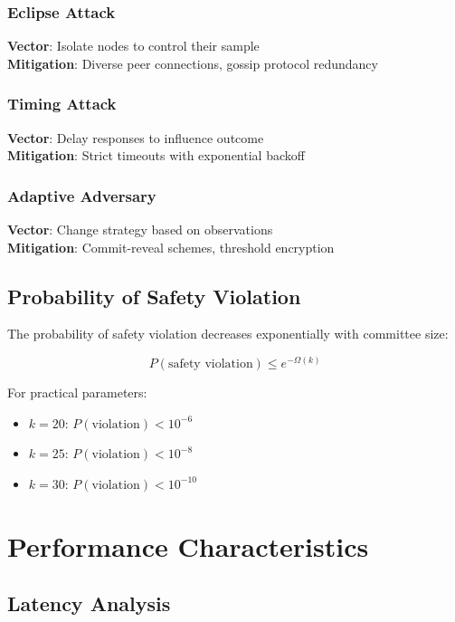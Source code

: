 \documentclass[11pt,a4paper]{article}
\begin{document}
\subsubsection{Eclipse Attack}
\textbf{Vector}: Isolate nodes to control their sample\\
\textbf{Mitigation}: Diverse peer connections, gossip protocol redundancy

\subsubsection{Timing Attack}
\textbf{Vector}: Delay responses to influence outcome\\
\textbf{Mitigation}: Strict timeouts with exponential backoff

\subsubsection{Adaptive Adversary}
\textbf{Vector}: Change strategy based on observations\\
\textbf{Mitigation}: Commit-reveal schemes, threshold encryption

\subsection{Probability of Safety Violation}

The probability of safety violation decreases exponentially with committee size:

\begin{equation}
P(\text{safety violation}) \leq e^{-\Omega(k)}
\label{eq:safety}
\end{equation}

For practical parameters:
\begin{itemize}
\item $k = 20$: $P(\text{violation}) < 10^{-6}$
\item $k = 25$: $P(\text{violation}) < 10^{-8}$
\item $k = 30$: $P(\text{violation}) < 10^{-10}$
\end{itemize}

\section{Performance Characteristics}
\label{sec:performance}

\subsection{Latency Analysis}
\end{document}
